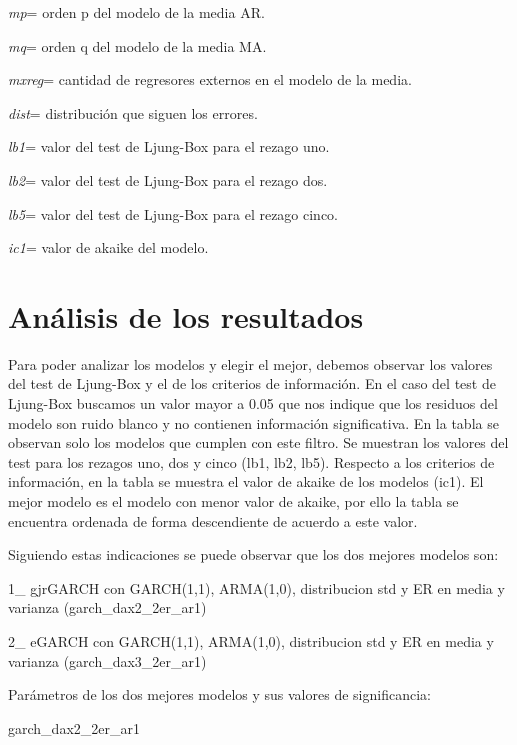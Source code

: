 \documentclass[
  11pt,
]{article}
\newenvironment{Shaded}{\begin{snugshade}}{\end{snugshade}}
\newcommand{\NormalTok}[1]{#1}
\begin{document}
\emph{mp}= orden p del modelo de la media AR.

\emph{mq}= orden q del modelo de la media MA.

\emph{mxreg}= cantidad de regresores externos en el modelo de la media.

\emph{dist}= distribución que siguen los errores.

\emph{lb1}= valor del test de Ljung-Box para el rezago uno.

\emph{lb2}= valor del test de Ljung-Box para el rezago dos.

\emph{lb5}= valor del test de Ljung-Box para el rezago cinco.

\emph{ic1}= valor de akaike del modelo.

\hypertarget{anuxe1lisis-de-los-resultados}{%
\section{Análisis de los
resultados}\label{anuxe1lisis-de-los-resultados}}

Para poder analizar los modelos y elegir el mejor, debemos observar los
valores del test de Ljung-Box y el de los criterios de información. En
el caso del test de Ljung-Box buscamos un valor mayor a 0.05 que nos
indique que los residuos del modelo son ruido blanco y no contienen
información significativa. En la tabla se observan solo los modelos que
cumplen con este filtro. Se muestran los valores del test para los
rezagos uno, dos y cinco (lb1, lb2, lb5). Respecto a los criterios de
información, en la tabla se muestra el valor de akaike de los modelos
(ic1). El mejor modelo es el modelo con menor valor de akaike, por ello
la tabla se encuentra ordenada de forma descendiente de acuerdo a este
valor.

Siguiendo estas indicaciones se puede observar que los dos mejores
modelos son:

1\_ gjrGARCH con GARCH(1,1), ARMA(1,0), distribucion std y ER en media y
varianza (garch\_dax2\_2er\_ar1)

2\_ eGARCH con GARCH(1,1), ARMA(1,0), distribucion std y ER en media y
varianza (garch\_dax3\_2er\_ar1)

Parámetros de los dos mejores modelos y sus valores de significancia:

\begin{Shaded}
\begin{Highlighting}[]
\NormalTok{garch_dax2_2er_ar1}
\end{Highlighting}
\end{Shaded}
\end{document}
